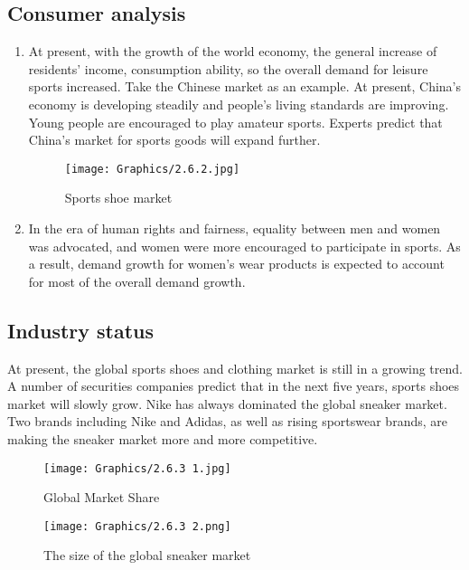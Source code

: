 \documentclass[a4paper, 12pt]{report}
\begin{document}
\subsection{Consumer analysis}
\begin{enumerate}
    \item At present, with the growth of the world economy, the general increase of residents' income, consumption ability, so the overall demand for leisure sports increased. Take the Chinese market as an example. At present, China's economy is developing steadily and people's living standards are improving. Young people are encouraged to play amateur sports. Experts predict that China's market for sports goods will expand further.
         \begin{figure}[ht]
 			\begin{center}
				\texttt{[image: Graphics/2.6.2.jpg]}
			\end{center}
       		\caption{\label{2.6.2}Sports shoe market}
        \end{figure}
    \item In the era of human rights and fairness, equality between men and women was advocated, and women were more encouraged to participate in sports. As a result, demand growth for women's wear products is expected to account for most of the overall demand growth. 

\end{enumerate}
\subsection{Industry status}
At present, the global sports shoes and clothing market is still in a growing trend. A number of securities companies predict that in the next five years, sports shoes market will slowly grow. Nike has always dominated the global sneaker market. Two brands including Nike and Adidas, as well as rising sportswear brands, are making the sneaker market more and more competitive.
\begin{figure}[htbp]
     \centering
     \begin{minipage}{.45\linewidth}
     \centering
     \texttt{[image: Graphics/2.6.3 1.jpg]}
     \caption{\label{2.6.3.1}Global Market Share}
     \end{minipage}
     \qquad
     \begin{minipage}{.45\linewidth}
     \centering
     \texttt{[image: Graphics/2.6.3 2.png]}
     \caption{\label{2.6.3.2}The size of the global sneaker market}
     \end{minipage}
 \end{figure}
\end{document}
